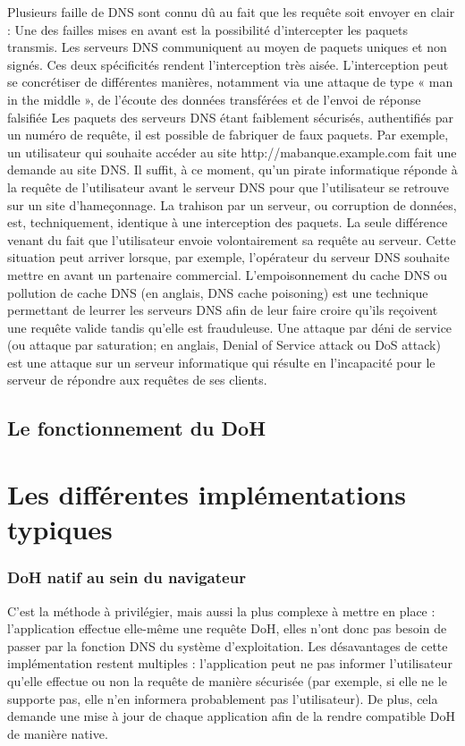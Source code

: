 \documentclass[a4paper,12pt]{article}
\begin{document}
	Plusieurs faille de DNS sont connu dû au fait que les requête soit envoyer en clair : 
	Une des failles mises en avant est la possibilité d'intercepter les paquets transmis. Les serveurs DNS communiquent au moyen de paquets uniques et non signés. Ces deux spécificités rendent l'interception très aisée. L'interception peut se concrétiser de différentes manières, notamment via une attaque de type « man in the middle », de l'écoute des données transférées et de l'envoi de réponse falsifiée
	Les paquets des serveurs DNS étant faiblement sécurisés, authentifiés par un numéro de requête, il est possible de fabriquer de faux paquets. Par exemple, un utilisateur qui souhaite accéder au site http://mabanque.example.com fait une demande au site DNS. Il suffit, à ce moment, qu'un pirate informatique réponde à la requête de l'utilisateur avant le serveur DNS pour que l'utilisateur se retrouve sur un site d'hameçonnage.
	La trahison par un serveur, ou corruption de données, est, techniquement, identique à une interception des paquets. La seule différence venant du fait que l'utilisateur envoie volontairement sa requête au serveur. Cette situation peut arriver lorsque, par exemple, l'opérateur du serveur DNS souhaite mettre en avant un partenaire commercial.
	L'empoisonnement du cache DNS ou pollution de cache DNS (en anglais, DNS cache poisoning) est une technique permettant de leurrer les serveurs DNS afin de leur faire croire qu'ils reçoivent une requête valide tandis qu'elle est frauduleuse.
	Une attaque par déni de service (ou attaque par saturation; en anglais, Denial of Service attack ou DoS attack) est une attaque sur un serveur informatique qui résulte en l'incapacité pour le serveur de répondre aux requêtes de ses clients.
	
	\subsection{Le fonctionnement du DoH}
	
	\section{Les différentes implémentations typiques}
	
	\subsubsection{DoH natif au sein du navigateur}
	
	C'est la méthode à privilégier, mais aussi la plus complexe à mettre en place : l'application effectue elle-même une requête DoH, elles n'ont donc pas besoin de passer par la fonction DNS du système d'exploitation. Les désavantages de cette implémentation restent multiples : l'application peut ne pas informer l'utilisateur qu'elle effectue ou non la requête de manière sécurisée (par exemple, si elle ne le supporte pas, elle n'en informera probablement pas l'utilisateur). De plus, cela demande une mise à jour de chaque application afin de la rendre compatible DoH de manière native.
	
\end{document}
